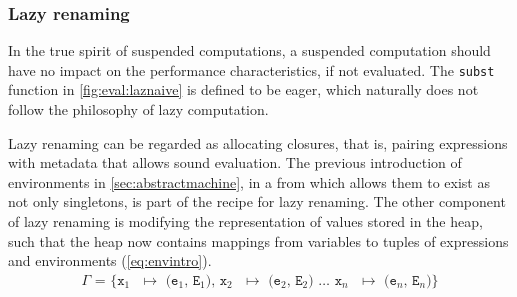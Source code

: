   

\subsubsection{Lazy renaming}
In the true spirit of suspended computations, a suspended computation should have no impact on the performance characteristics, if not evaluated.
The \texttt{subst} function in \autoref{fig:eval:laznaive} is defined to be eager, which naturally does not follow the philosophy of lazy computation. 

Lazy renaming can be regarded as allocating closures, that is, pairing expressions with metadata that allows sound evaluation.
The previous introduction of environments in \autoref{sec:abstractmachine}, in a from which allows them to exist as not only singletons, is part of the recipe for lazy renaming.
The other component of lazy renaming is modifying the representation of values stored in the heap, such that the heap now contains mappings from variables to tuples of expressions and environments (\autoref{eq:envintro}).
\begin{align}
  \texttt{$\Gamma$ = \{x$_1$ $\mapsto$ (e$_1$, E$_1$), x$_2$ $\mapsto$ (e$_2$, E$_2$) $\dots$ x$_n$ $\mapsto$ (e$_n$, E$_n$)\}}\label{eq:envintro}
\end{align}


